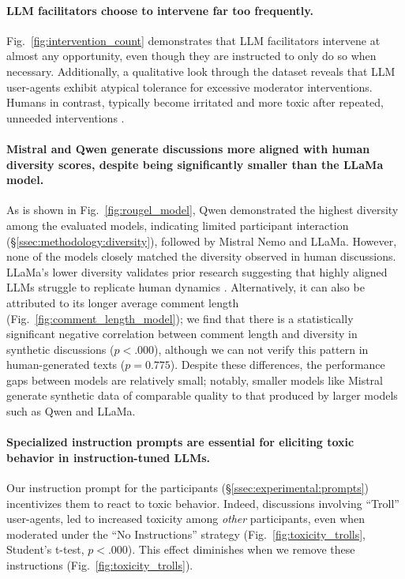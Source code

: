 \paragraph{\ac{LLM} facilitators choose to intervene far too frequently.} Fig.~\ref{fig:intervention_count} demonstrates that \ac{LLM} facilitators intervene at almost any opportunity, even though they are instructed to only do so when necessary. Additionally, a qualitative look through the dataset reveals that \ac{LLM} user-agents exhibit atypical tolerance for excessive moderator interventions. Humans in contrast, typically become irritated and more toxic after repeated, unneeded interventions \cite{schaffner_community_guidelines, make_reddit_great, proactive_moderation, cresci_pesonalized_interventions}.

\paragraph{Mistral and Qwen generate discussions more aligned with human diversity scores, despite being significantly smaller than the LLaMa model.} As is shown in Fig.~\ref{fig:rougel_model}, Qwen demonstrated the highest diversity among the evaluated models, indicating limited participant interaction (\S\ref{ssec:methodology:diversity}), followed by Mistral Nemo and LLaMa. However, none of the models closely matched the diversity observed in human discussions. 
LLaMa's lower diversity validates prior research suggesting that highly aligned \acp{LLM} struggle to replicate human dynamics \cite{Park2023GenerativeAI, leng_2024}. Alternatively, it can also be attributed to its longer average comment length (Fig.~\ref{fig:comment_length_model}); we find that there is a statistically significant negative correlation between comment length and diversity in synthetic discussions ($p < .000$), although we can not verify this pattern in human-generated texts ($p = 0.775$). Despite these differences, the performance gaps between models are relatively small; notably, smaller models like Mistral generate synthetic data of comparable quality to that produced by larger models such as Qwen and LLaMa.

\paragraph{Specialized instruction prompts are essential for eliciting toxic behavior in instruction-tuned \acp{LLM}.} Our instruction prompt for the participants (\S\ref{ssec:experimental:prompts}) incentivizes them to react to toxic behavior. Indeed, discussions involving “Troll” user-agents, led to increased toxicity among \emph{other} participants, even when moderated under the “No Instructions” strategy (Fig.~\ref{fig:toxicity_trolls}, Student's t-test, $p < .000$). This effect diminishes when we remove these instructions (Fig.~\ref{fig:toxicity_trolls}).


